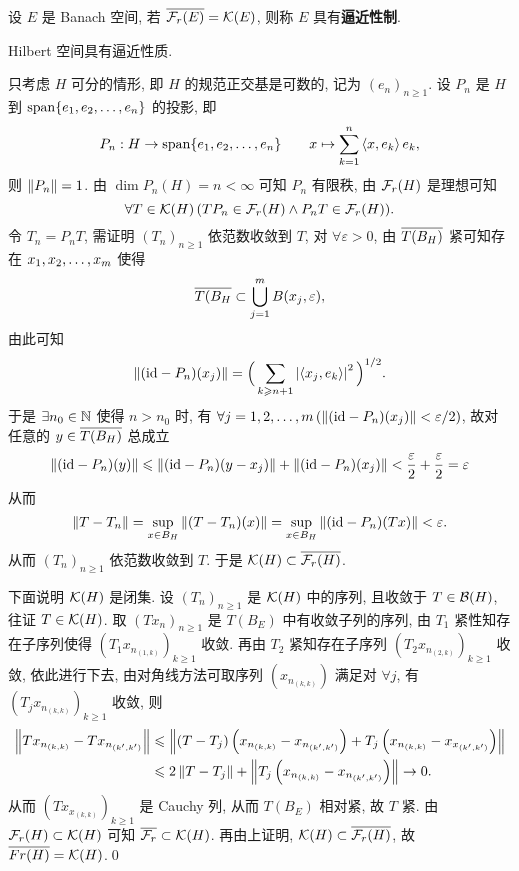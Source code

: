 	\begin{Definition}[逼近性质]\label{def:逼近性质}
		设 $ E $ 是 Banach 空间, 若 $ \baro{\Fr(E)}=\CK(E) $, 则称 $ E $ 具有\textbf{逼近性制}.
	\end{Definition}

	\begin{Theorem}
		Hilbert 空间具有逼近性质.
	\end{Theorem}
	\begin{Proof}
		只考虑 $ H $ 可分的情形, 即 $ H $ 的规范正交基是可数的, 记为 $ (e_{n})_{n\geqslant1} $. 设 $ P_{n} $ 是 $ H $ 到 $ \Span\{ \seq{e} \} $ 的投影, 即
		\[
			P_{n}: H\to\Span\{ \seq{e} \}\qquad x\mapsto \sum_{k=1}^{n}\lrangle{x, e_{k}}e_{k},
		\]
		则 $ \norm{P_{n}}=1 $. 由 $ \dim P_{n}(H)=n<\infty $ 可知 $ P_{n} $ 有限秩, 由 $ \Fr(H) $ 是理想可知
		\[
			\forall T\in\CK(H)\,(TP_{n}\in\Fr(H)\land P_{n}T\in\Fr(H)).
		\]
		令 $ T_{n}=P_{n}T $, 需证明 $ (T_{n})_{n\geqslant1} $ 依范数收敛到 $ T $, 对 $ \forall\varepsilon>0 $, 由 $ \baro{T(B_{H})} $ 紧可知存在 $ \seq[m]{x} $ 使得
		\[
			\baro{T(B_{H}}\subset\bigcup_{j=1}^{m}B(x_{j}, \varepsilon),
		\]
		由此可知
		\[
			\norm{(\id -P_{n})(x_{j})}=\Big( \sum_{k\geqslant n+1} \abs{\lrangle{x_{j}, e_{k}}}^{2} \Big)^{1/2}.
		\]
		于是 $ \exists n_{0}\in\N $ 使得 $ n>n_{0} $ 时, 有 $ \forall j= 1, 2, \dots, m\,(\norm{(\id-P_{n})(x_{j})}<\varepsilon/2) $, 故对任意的 $ y\in\baro{T(B_{H})} $ 总成立
		\[
			\norm{(\id-P_{n})(y)}\leqslant\norm{(\id-P_{n})(y-x_{j})}+\norm{(\id-P_{n})(x_{j})}<\frac{\varepsilon}{2}+\frac{\varepsilon}{2}=\varepsilon
		\]
		从而
		\[
			\norm{T-T_{n}}=\sup_{x\in B_{H}}\norm{(T-T_{n})(x)}=\sup_{x\in B_{H}}\norm{(\id-P_{n})(Tx)}<\varepsilon.
		\]
		从而 $ (T_{n})_{n\geqslant1} $ 依范数收敛到 $ T $. 于是 $ \CK(H)\subset\baro{\Fr(H)} $.

		下面说明 $ \CK(H) $ 是闭集. 设 $ (T_{n})_{n\geqslant1} $ 是 $ \CK(H) $ 中的序列, 且收敛于 $ T\in\CB(H) $, 往证 $ T\in\CK(H) $. 取 $ (Tx_{n})_{n\geqslant1} $ 是 $ T(B_{E}) $ 中有收敛子列的序列, 由 $ T_{1} $ 紧性知存在子序列使得 $ \left(T_{1}x_{n_{(1, k)}}\right)_{k\geqslant1} $ 收敛. 再由 $ T_{2} $ 紧知存在子序列 $ \left(T_{2}x_{n_{(2, k)}}\right)_{k\geqslant1} $ 收敛, 依此进行下去, 由对角线方法可取序列 $ \left(x_{n_{(k, k)}}\right) $ 满足对 $ \forall j $, 有 $ \left(T_{j}x_{n_{(k, k)}}\right)_{k\geqslant1} $ 收敛, 则
		\[
			\begin{aligned}
				\norm{Tx_{n_{(k, k)}}-Tx_{n_{(k', k')}}} & \leqslant \norm{(T-T_{j})\left(x_{n_{(k, k)}}-x_{n_{(k', k')}}\right)+T_{j}\left(x_{n_{(k, k)}}-x_{x_{(k', k')}}\right)}\\
				& \leqslant 2\norm{T-T_{j}}+\norm{T_{j}\left(x_{n_{(k, k)}}-x_{n_{(k', k')}}\right)}\to 0.
			\end{aligned}
		\] 
		从而 $ \left( Tx_{x_{(k, k)}} \right)_{k\geqslant1} $ 是 Cauchy 列, 从而 $ T(B_{E}) $ 相对紧, 故 $ T $ 紧. 由 $ \Fr(H)\subset\CK(H) $ 可知 $ \baro{\Fr}\subset \CK(H) $. 再由上证明, $ \CK(H)\subset\baro{\Fr(H)} $, 故 $ \baro{Fr(H)}=\CK(H) $.\qed
	\end{Proof}

